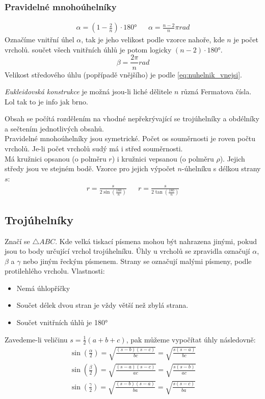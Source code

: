 \documentclass[12pt]{article}
\begin{document}
\subsubsection{Pravidelné mnohoúhelníky}
\begin{align}
\alpha = \left(1- \frac{2}{n}\right)\cdot180° && \alpha = \frac{n-2}{n}\pi rad
\end{align}
Označíme vnitřní úhel $\alpha$, tak je jeho velikost podle vzorce nahoře, kde $n$ je počet vrcholů. součet všech vnitřních úhlů je potom logicky $(n-2)\cdot180°$.\\
\begin{equation}
\label{eq:nuhelnik_vnejsi}
\beta = \frac{2\pi}{n} rad
\end{equation}
Velikost středového úhlu (popřípadě  vnějšího) je podle \ref{eq:nuhelnik_vnejsi}.\\
\begin{scriptsize}
\emph{Eukleidovská konstrukce} je možná jsou-li liché dělitele $n$ různá Fermatova čísla. Lol tak to je info jak brno.\\
\end{scriptsize}
Obsah se počítá rozdělením na vhodné nepřekrývající se trojúhelníky a obdélníky a sečtením jednotlivých obsahů.\\
Pravidelné mnohoúhelníky jsou symetrické. Počet os souměrnosti je roven počtu vrcholů. Je-li počet vrcholů sudý má i střed souměrnosti.\\
Má kružnici opsanou (o polměru $r$) i kružnici vepsanou (o polměru $\rho$).  Jejich středy jsou ve stejném bodě. Vzorce pro jejich výpočet $n$-úhelníku s délkou strany $s$:
\begin{align}
r = \frac{s}{2\sin\left(\frac{180}{n} \right)} &&r = \frac{s}{2\tan \left(\frac{180}{n} \right)}
\end{align}

\subsection{Trojúhelníky}
\label{sec:troj}
Značí se $\bigtriangleup ABC$. Kde velká tiskací písmena mohou být nahrazena jinými, pokud jsou to body určující vrchol trojúhelníku. Úhly u vrcholů se zpravidla označují $\alpha$, $\beta$ a $\gamma$ nebo jiným řeckým písmenem. Strany se označují malými písmeny, podle protilehlého vrcholu. Vlastnosti:
\begin{itemize}
\item Nemá úhlopříčky
\item Součet délek dvou stran je vždy větší než zbylá strana.
\item Součet vnitřních úhlů je 180°
\end{itemize}
Zavedeme-li veličinu $s = \frac{1}{2}(a+b+c)$, pak můžeme vypočítat úhly následovně:
\begin{align}
\sin\left(\frac{\alpha}{2}\right) = \sqrt{\frac{(s-b)(s-c)}{bc}} = \sqrt{\frac{s(s-a)}{bc}}\\
\sin\left(\frac{\beta}{2}\right) = \sqrt{\frac{(s-a)(s-c)}{ac}} = \sqrt{\frac{s(s-b)}{ac}}\\
\sin\left(\frac{\gamma}{2}\right) = \sqrt{\frac{(s-b)(s-a)}{ba}} = \sqrt{\frac{s(s-c)}{ba}}
\end{align}
\end{document}
